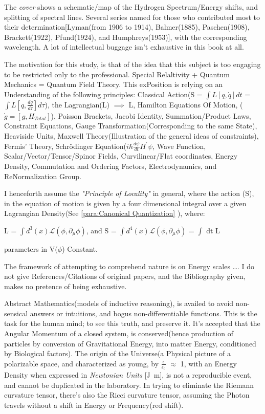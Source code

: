 \documentclass[a4paper, 10pt, onepage]{elegantbook}
\begin{document}
The \emph{cover} shows  a schematic/map of the Hydrogen Spectrum/Energy shifts, and splitting of spectral lines.
Several series named for those who contributed most to their determination[Lyman(from 1906 to 1914), Balmer(1885),
Paschen(1908), Brackett(1922), Pfund(1924), and Humphreys(1953)], with the corresponding wavelength.
A lot of intellectual buggage isn't exhaustive in this book at all.

 The motivation for this study, is that of the idea that this subject is too engaging to be restricted only to the 
professional.
 Special Relaltivity + Quantum Mechanics = Quantum Field Theory. 
This exPosition is relying on an Understanding of the following principles:
 Classical Action(S = $\int L [q,\dot{q}] dt$ = $\int L [q, \frac{dq}{d\tau}] d\tau$),
 the Lagrangian(L) $\implies$ L, Hamilton Equations Of Motion, ($\dot{g} = [g, H_{Total}]$),
 Poisson Brackets, Jacobi Identity, Summation/Product Laws, Constraint Equations,
 Gauge Transformation(Corresponding to the same State), Heaviside Units,
 Maxwell Theory(Illustration of the general ideas of constraints), Fermis' Theory,
 Schr\"odinger Equation($i \hbar \frac{d \psi}{dt} H^\prime \psi$,
 Wave Function, Scalar/Vector/Tensor/Spinor Fields, Curvilinear/Flat coordinates, Energy Density, 
Commutation and Ordering Factors, Electrodynamics, and ReNormalization Group.

  I henceforth assume the \emph{"Principle of Locality"} in general, where the action (S),
  in the equation of motion is given by a four dimensional integral over a given Lagrangian Density(See 
\ref{para:Canonical Quantization} ), where:

L = $\int d^3 (x) \mathcal{L}(\phi, \partial_\mu \phi)$, and S = $\int d^4 (x)
\mathcal{L} (\phi, \partial_\mu \phi)$ = $\int$ dt L

parameters in V($\phi$) Constant.

The framework of attempting to comprehend nature is on Energy scales \ldots.
I do not give References/Citations of original papers, and the Bibliography given, makes no pretence of being 
exhaustive.

Abstract Mathematics(models of inductive reasoning), is availed to avoid non-sensical answers or intuitions, and bogus 
non-differentiable functions.
This is the task for the human mind; to see this truth, and preserve it.  
It's accepted that the Angular Momentum of a closed system, is conserved(hence production of particles by conversion of 
Gravitational Energy,
into matter Energy, conditioned by Biological factors).  
The origin of the Universe(a Physical picture of a polarizable space, and characterized as young, by $\frac{\epsilon} 
{\epsilon_0}$ $\approx$ 1,
with an Energy Density when expressed in \emph{Newtonian Units} [\unit{\joule\meter}], is not a reproducible event,
and cannot be duplicated in the laboratory. In trying to eliminate the Riemann curvature tensor, 
there's also the Ricci curvature tensor, assuming the Photon travels without a shift in Energy or Frequency(red shift). 
 
\end{document}
